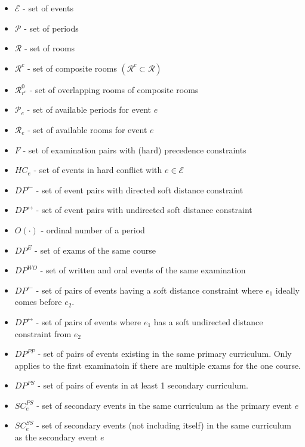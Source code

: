 \documentclass{article}
\newcommand{\scriptP}{\mathcal{P}}
\newcommand{\scriptR}{\mathcal{R}}
\newcommand{\scriptE}{\mathcal{E}}
\begin{document}
\begin{itemize}
    \item $\scriptE$ - set of events
    \item $\scriptP$ - set of periods
    \item $\scriptR$ - set of rooms
    \item $\scriptR^c$ - set of composite rooms $(\scriptR^c \subset \scriptR)$
    \item $\scriptR^0_{r^c}$ - set of overlapping rooms of composite rooms
    \item $\scriptP_e$ - set of available periods for event $e$
    \item $\scriptR_e$ - set of available rooms for event $e$
    \item $F$ - set of examination pairs with (hard) precedence constraints
    \item $HC_e$ - set of events in hard conflict with $e\in \scriptE$
    \item $DP^{\leftarrow}$ - set of event pairs with directed soft distance constraint
    \item $DP^{\leftrightarrow}$ - set of event pairs with undirected soft distance constraint
    \item $O(\cdot)$ - ordinal number of a period
    \item $DP^{E}$ - set of exams of the same course
    \item $DP^{WO}$ - set of written and oral events of the same examination
    \item $DP^{\leftarrow}$ - set of pairs of events having a soft distance constraint where $e_1$ ideally comes before $e_2$.
    \item $DP^{\leftrightarrow}$ - set of pairs of events where $e_1$ has a soft undirected distance constraint from $e_2$
    \item $DP^{PP}$ - set of pairs of events existing in the same primary curriculum. Only applies to the first examinatoin if there are multiple exams for the one course.
    \item $DP^{PS}$ - set of pairs of events in at least 1 secondary curriculum.    
    \item $SC^{PS}_e$ - set of secondary events in the same curriculum as the primary event $e$
    \item $SC^{SS}_e$ - set of secondary events (not including itself) in the same curriculum as the secondary event $e$
\end{itemize}

\bigbreak
\end{document}
